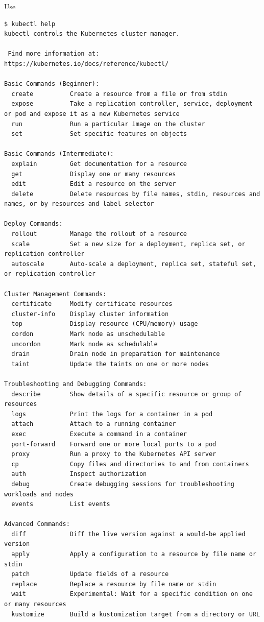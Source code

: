 Use
\begin{lstlisting}
$ kubectl help
kubectl controls the Kubernetes cluster manager.

 Find more information at: https://kubernetes.io/docs/reference/kubectl/

Basic Commands (Beginner):
  create          Create a resource from a file or from stdin
  expose          Take a replication controller, service, deployment or pod and expose it as a new Kubernetes service
  run             Run a particular image on the cluster
  set             Set specific features on objects

Basic Commands (Intermediate):
  explain         Get documentation for a resource
  get             Display one or many resources
  edit            Edit a resource on the server
  delete          Delete resources by file names, stdin, resources and names, or by resources and label selector

Deploy Commands:
  rollout         Manage the rollout of a resource
  scale           Set a new size for a deployment, replica set, or replication controller
  autoscale       Auto-scale a deployment, replica set, stateful set, or replication controller

Cluster Management Commands:
  certificate     Modify certificate resources
  cluster-info    Display cluster information
  top             Display resource (CPU/memory) usage
  cordon          Mark node as unschedulable
  uncordon        Mark node as schedulable
  drain           Drain node in preparation for maintenance
  taint           Update the taints on one or more nodes

Troubleshooting and Debugging Commands:
  describe        Show details of a specific resource or group of resources
  logs            Print the logs for a container in a pod
  attach          Attach to a running container
  exec            Execute a command in a container
  port-forward    Forward one or more local ports to a pod
  proxy           Run a proxy to the Kubernetes API server
  cp              Copy files and directories to and from containers
  auth            Inspect authorization
  debug           Create debugging sessions for troubleshooting workloads and nodes
  events          List events

Advanced Commands:
  diff            Diff the live version against a would-be applied version
  apply           Apply a configuration to a resource by file name or stdin
  patch           Update fields of a resource
  replace         Replace a resource by file name or stdin
  wait            Experimental: Wait for a specific condition on one or many resources
  kustomize       Build a kustomization target from a directory or URL


\end{lstlisting}

